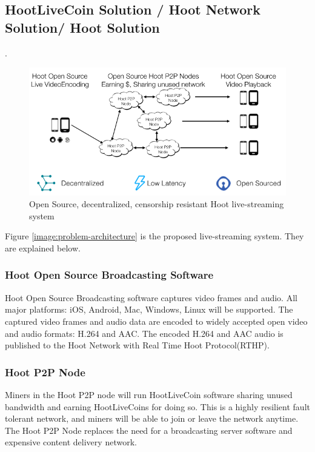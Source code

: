 \documentclass{article}
\begin{document}
\subsection{HootLiveCoin Solution / Hoot Network Solution/ Hoot Solution}
 .

\begin{figure}[h!]
 \centering
 \includegraphics[width=1.0\textwidth]{static/hoot-solution}
 \caption{Open Source, decentralized, censorship resistant Hoot live-streaming system}
 \label{image:hoot-solution}
\end{figure}


Figure \ref{image:problem-architecture} is the proposed live-streaming system. They are explained below.
\subsubsection{Hoot Open Source Broadcasting Software}
Hoot Open Source Broadcasting software captures video frames and audio. All major platforms: iOS, Android, Mac, Windows, Linux will be supported. The captured video frames and audio data are encoded to widely accepted open video and audio formats: H.264 and AAC. The encoded H.264 and AAC audio is published to the Hoot Network with Real Time Hoot Protocol(RTHP).

\subsubsection{Hoot P2P Node}
Miners in the Hoot P2P node will run HootLiveCoin software sharing unused bandwidth and earning HootLiveCoins for doing so. This is a highly resilient fault tolerant network, and miners will be able to join or leave the network anytime. The Hoot P2P Node replaces the need for a broadcasting server software and expensive content delivery network.
\end{document}
